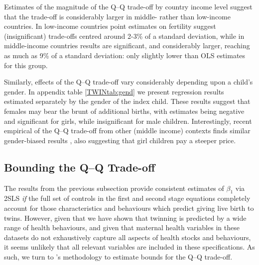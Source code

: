 \documentclass[subeqn]{article}
\begin{document}
\begin{spacing}{1.4}
Estimates of the magnitude of the Q--Q trade-off by country income level suggest 
that the trade-off is considerably larger in middle- rather than low-income 
countries. In low-income countries point estimates on fertility suggest 
(insignificant) trade-offs centred around 2-3\% of a standard deviation, while 
in middle-income countries results are significant, and considerably larger,
reaching as much as 9\% of a standard deviation: only slightly lower than OLS 
estimates for this group.

Similarly, effects of the Q--Q trade-off vary considerably depending upon a 
child's gender. In appendix table \ref{TWINtab:gend} we present regression 
results estimated separately by the gender of the index child. These results 
suggest that females may bear the brunt of additional births, with estimates
being negative and significant for girls, while insignificant for male children. 
Interestingly, recent empirical of the Q--Q trade-off from other (middle income)
contexts finds similar gender-biased results \citep{SouzaPonczek2012}, also
suggesting that girl children pay a steeper price.



\subsection{Bounding the Q--Q Trade-off}           \label{TWINsscn:resultBounds}
The results from the previous subsection provide consistent estimates of 
$\beta_1$ via 2SLS \emph{if} the full set of controls in the first and second 
stage equations completely account for those characteristics and behaviours 
which predict giving live birth to twins. However, given that we have shown that 
twinning is predicted by a wide range of health behaviours, and given that 
maternal health variables in these datasets do not exhaustively capture all 
aspects of health stocks and behaviours, it seems unlikely that all relevant 
variables are included in these specifications. As such, we turn to 
\citeauthor{Conleyetal2012}'s \citeyear{Conleyetal2012} methodology to estimate 
bounds for the Q--Q trade-off.  


\end{spacing}
\end{document}
